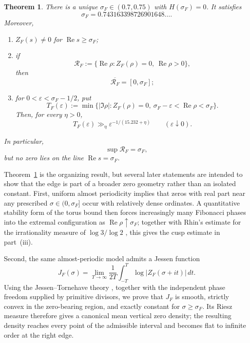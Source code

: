 \documentclass[11pt]{article}
\newtheorem{theorem}{Theorem}[section]
\theoremstyle{remark}
\newcommand{\ZF}{Z_F}
\newcommand{\Ree}{\operatorname{Re}}
\newcommand{\JF}{J_F}
\begin{document}
\begin{theorem}\label{thm:main}
There is a unique $\sigma_F\in(0.7,0.75)$ with $H(\sigma_F)=0$.  It satisfies
\[
\sigma_F=0.743163398726901648\ldots.
\]
Moreover,
\begin{enumerate}[label=\textup{(\roman*)}]
\item $\ZF(s)\neq0$ for $\Ree s\ge\sigma_F$;
\item if
\[
\mathcal R_F:=\{\Ree\rho:\ZF(\rho)=0,\ \Ree\rho>0\},
\]
then
\[
\overline{\mathcal R_F}=[0,\sigma_F];
\]
\item for $0<\varepsilon<\sigma_F-1/2$, put
\[
T_F(\varepsilon):=\min\bigl\{|\Im\rho|:\ZF(\rho)=0,\ \sigma_F-\varepsilon<\Ree\rho<\sigma_F\bigr\}.
\]
Then, for every $\eta>0$,
\begin{equation}\label{eq:T-lower-main}
T_F(\varepsilon)\gg_\eta \varepsilon^{-1/(15.232+\eta)}
\qquad(\varepsilon\downarrow0).
\end{equation}
\end{enumerate}
In particular,
\[
\sup\mathcal R_F=\sigma_F,
\]
but no zero lies on the line $\Ree s=\sigma_F$.
\end{theorem}

Theorem~\ref{thm:main} is the organizing result, but several later statements are intended to show that the edge is part of a broader zero geometry rather than an isolated constant.  First, uniform almost periodicity implies that zeros with real part near any prescribed $\sigma\in(0,\sigma_F]$ occur with relatively dense ordinates.  A quantitative stability form of the torus bound then forces increasingly many Fibonacci phases into the extremal configuration as $\Ree\rho\uparrow\sigma_F$; together with Rhin's estimate for the irrationality measure of $\log3/\log2$ \cite{Rhin1987}, this gives the cusp estimate in part~(iii).

Second, the same almost-periodic model admits a Jessen function
\[
\JF(\sigma)=\lim_{T\to\infty}\frac1{2T}\int_{-T}^{T}\log|\ZF(\sigma+it)|\,dt.
\]
Using the Jessen--Tornehave theory \cite{Jessen1933,JessenTornehave1945}, together with the independent phase freedom supplied by primitive divisors, we prove that $\JF$ is smooth, strictly convex in the zero-bearing region, and exactly constant for $\sigma\ge\sigma_F$.  Its Riesz measure therefore gives a canonical mean vertical zero density; the resulting density reaches every point of the admissible interval and becomes flat to infinite order at the right edge.
\end{document}

